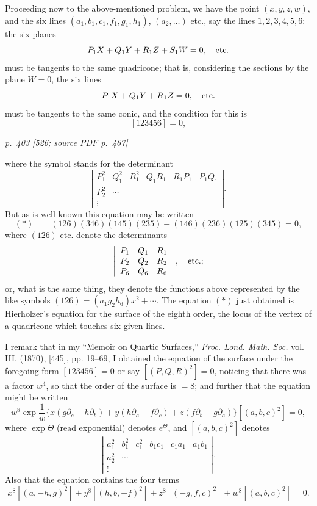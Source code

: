 \documentclass[11pt,a4paper]{article}
\newcommand{\pagemarker}[3]{\par\bigskip\noindent\textit{p.~#1 [#2; source PDF p.~#3]}\par\smallskip}
\begin{document}
Proceeding now to the above-mentioned problem, we have the point $(x,y,z,w)$, and
the six lines $(a_1,b_1,c_1,f_1,g_1,h_1)$, $(a_2,\ldots)$ etc., say the lines
$1,2,3,4,5,6$: the six planes
\[
P_1X+Q_1Y+R_1Z+S_1W=0,\quad\hbox{etc.}
\]
must be tangents to the same quadricone; that is, considering the sections by the
plane $W=0$, the six lines
\[
P_1X+Q_1Y+R_1Z=0,\quad\hbox{etc.}
\]
must be tangents to the same conic, and the condition for this is
\[
[123456]=0,
\]

\pagemarker{403}{526}{467}

where the symbol stands for the determinant
\[
\left|\begin{array}{cccccc}
P_1^2&Q_1^2&R_1^2&Q_1R_1&R_1P_1&P_1Q_1\\
P_2^2&\cdots&&&&\\
\vdots&&&&&
\end{array}\right|.
\]
But as is well known this equation may be written
\[
(*)\qquad
(126)(346)(145)(235)-(146)(236)(125)(345)=0,
\]
where $(126)$ etc. denote the determinants
\[
\left|\begin{array}{ccc}
P_1&Q_1&R_1\\
P_2&Q_2&R_2\\
P_6&Q_6&R_6
\end{array}\right|,\quad\hbox{etc.;}
\]
or, what is the same thing, they denote the functions above represented by the like
symbols $(126)=(a_1g_2h_6)x^2+\cdots$. The equation $(*)$ just obtained is
Hierholzer's equation for the surface of the eighth order, the locus of the vertex of a
quadricone which touches six given lines.

I remark that in my ``Memoir on Quartic Surfaces,'' \textit{Proc. Lond. Math. Soc.}
vol. III. (1870), [445], pp. 19--69, I obtained the equation of the surface under the
foregoing form $[123456]=0$ or say $[(P,Q,R)^2]=0$, noticing that there was a factor
$w^4$, so that the order of the surface is $=8$; and further that the equation might be
written
\[
w^8\exp\frac1w\{x(g\partial_c-h\partial_b)+y(h\partial_a-f\partial_c)
+z(f\partial_b-g\partial_a)\}[(a,b,c)^2]=0,
\]
where $\exp\Theta$ (read exponential) denotes $e^\Theta$, and $[(a,b,c)^2]$ denotes
\[
\left|\begin{array}{cccccc}
a_1^2&b_1^2&c_1^2&b_1c_1&c_1a_1&a_1b_1\\
a_2^2&\cdots&&&&\\
\vdots&&&&&
\end{array}\right|.
\]
Also that the equation contains the four terms
\[
x^8[(a,-h,g)^2]+y^8[(h,b,-f)^2]+z^8[(-g,f,c)^2]+w^8[(a,b,c)^2]=0.
\]
\end{document}
